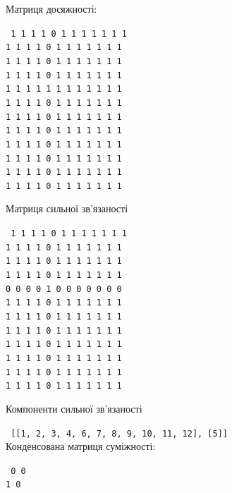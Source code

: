 \noindent
\begin{minipage}[t]{0.45\linewidth}
  \begin{framed}
    \noindent%
    Матриця досяжності:\\
    \raggedright\footnotesize\texttt{%
      1 1 1 1 0 1 1 1 1 1 1 1\\
      1 1 1 1 0 1 1 1 1 1 1 1\\
      1 1 1 1 0 1 1 1 1 1 1 1\\
      1 1 1 1 0 1 1 1 1 1 1 1\\
      1 1 1 1 1 1 1 1 1 1 1 1\\
      1 1 1 1 0 1 1 1 1 1 1 1\\
      1 1 1 1 0 1 1 1 1 1 1 1\\
      1 1 1 1 0 1 1 1 1 1 1 1\\
      1 1 1 1 0 1 1 1 1 1 1 1\\
      1 1 1 1 0 1 1 1 1 1 1 1\\
      1 1 1 1 0 1 1 1 1 1 1 1\\
      1 1 1 1 0 1 1 1 1 1 1 1\\
    }
  \end{framed}
\end{minipage}
\hfill
\begin{minipage}[t]{0.45\linewidth}
  \begin{framed}
    \noindent%
    Матриця сильної зв'язаності\\
    \raggedright\footnotesize\texttt{%
      1 1 1 1 0 1 1 1 1 1 1 1\\
      1 1 1 1 0 1 1 1 1 1 1 1\\
      1 1 1 1 0 1 1 1 1 1 1 1\\
      1 1 1 1 0 1 1 1 1 1 1 1\\
      0 0 0 0 1 0 0 0 0 0 0 0\\
      1 1 1 1 0 1 1 1 1 1 1 1\\
      1 1 1 1 0 1 1 1 1 1 1 1\\
      1 1 1 1 0 1 1 1 1 1 1 1\\
      1 1 1 1 0 1 1 1 1 1 1 1\\
      1 1 1 1 0 1 1 1 1 1 1 1\\
      1 1 1 1 0 1 1 1 1 1 1 1\\
      1 1 1 1 0 1 1 1 1 1 1 1\\
    }
  \end{framed}
\end{minipage}

\begin{framed}
  \noindent%
  Компоненти сильної зв'язаності\\
  \raggedright\footnotesize\texttt{%
    [[1, 2, 3, 4, 6, 7, 8, 9, 10, 11, 12], [5]]\\
  }
  \normalsize{
    Конденсована матриця суміжності:\\
  }
  \raggedright\footnotesize\texttt{%
    0 0\\
    1 0\\
  }
\end{framed}

